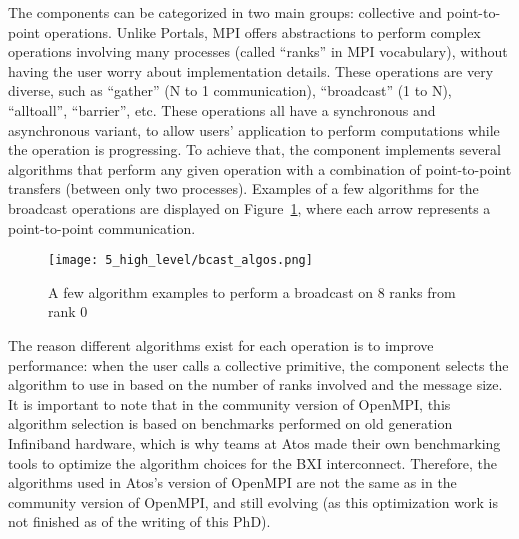 The components can be categorized in two main groups: collective and
point-to-point operations. Unlike Portals, MPI offers abstractions to perform
complex operations involving many processes (called ``ranks'' in MPI
vocabulary), without having the user worry about implementation details. These
operations are very diverse, such as ``gather'' (N to 1 communication),
``broadcast'' (1 to N), ``alltoall'', ``barrier'', etc. These operations all
have a synchronous and asynchronous variant, to allow users' application to
perform computations while the operation is progressing. To achieve that, the
 component implements several algorithms that perform any
given operation with a combination of point-to-point transfers (between only two
processes). Examples of a few algorithms for the broadcast operations are
displayed on Figure~\ref{fig:5_high_level:bcast_algos}, where each arrow
represents a point-to-point communication.

\begin{figure}[!ht]
    \centering
    \texttt{[image: 5\_high\_level/bcast\_algos.png]}
    \caption{A few algorithm examples to perform a broadcast on 8 ranks from rank 0}
    \label{fig:5_high_level:bcast_algos}
\end{figure}

The reason different algorithms exist for each operation is to improve
performance: when the user calls a collective primitive, the
 component selects the algorithm to use in
 based on the number of ranks involved and the message
size. It is important to note that in the community version of OpenMPI, this
algorithm selection is based on benchmarks performed on old generation
Infiniband hardware, which is why teams at Atos made their own benchmarking
tools to optimize the algorithm choices for the BXI interconnect. Therefore,
the algorithms used in Atos's version of OpenMPI are not the same as in the
community version of OpenMPI, and still evolving (as this optimization work is
not finished as of the writing of this PhD).

